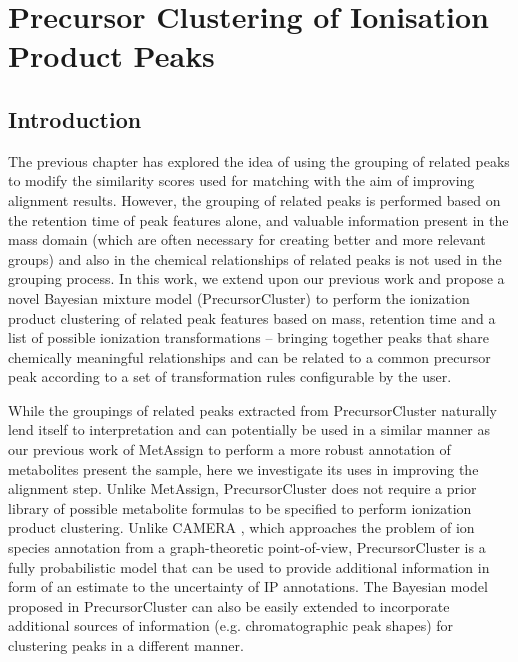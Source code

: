 \chapter{Precursor Clustering of Ionisation Product Peaks}
\label{c:background}


\section{Introduction}

The previous chapter has explored the idea of using the grouping of related peaks to modify the similarity scores  used for matching with the aim of improving alignment results. However, the grouping of related peaks is performed based on the retention time of peak features alone, and valuable information present in the mass domain (which are often necessary for creating better and more relevant groups) and also in the chemical relationships of related peaks is not used in the grouping process. In this work, we extend upon our previous work and propose a novel Bayesian mixture model (PrecursorCluster) to perform the ionization product clustering of related peak features based on mass, retention time and a list of possible ionization transformations -- bringing together peaks that share chemically meaningful relationships and can be related to a common precursor peak according to a set of transformation rules configurable by the user. 

While the groupings of related peaks extracted from PrecursorCluster naturally lend itself to interpretation and can potentially be used in a similar manner as our previous work of MetAssign \cite{Daly2014} to perform a more robust annotation of metabolites present the sample, here we investigate its uses in improving the alignment step. Unlike MetAssign, PrecursorCluster does not require a prior library of possible metabolite formulas to be specified to perform ionization product clustering. Unlike CAMERA \cite{Kuhl2012}, which approaches the problem of ion species annotation from a graph-theoretic point-of-view, PrecursorCluster is a fully probabilistic model that can be used to provide additional information in form of an estimate to the uncertainty of IP annotations. The Bayesian model proposed in PrecursorCluster can also be easily extended to incorporate additional sources of information (e.g. chromatographic peak shapes) for clustering peaks in a different manner. 

